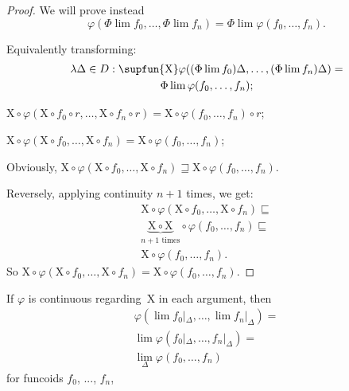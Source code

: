 \begin{proof}
  We will prove instead \[ \varphi (\Phi \lim f_0, \ldots, \Phi \lim f_n) = \Phi
  \lim \varphi (f_0, \ldots, f_n). \]
  
  Equivalently transforming:
\begin{multline*}
  \lambda \Delta \in D : \supfun{\mathrm{X}} \varphi ((\Phi \lim f_0) \Delta,
  \ldots, (\Phi \lim f_n) \Delta) =\\ \Phi \lim \varphi (f_0, \ldots, f_n);
\end{multline*}  

  $\mathrm{X} \circ \varphi (\mathrm{X} \circ f_0 \circ r, \ldots, \mathrm{X} \circ f_n \circ r) =
  \mathrm{X} \circ \varphi (f_0, \ldots, f_n) \circ r$;
  
  $\mathrm{X} \circ \varphi (\mathrm{X} \circ f_0, \ldots, \mathrm{X} \circ f_n) = \mathrm{X} \circ
  \varphi (f_0, \ldots, f_n)$;
  
  Obviously, $\mathrm{X} \circ \varphi (\mathrm{X} \circ f_0, \ldots, \mathrm{X} \circ f_n)
  \sqsupseteq \mathrm{X} \circ \varphi (f_0, \ldots, f_n)$.
  
  Reversely, applying continuity $n + 1$ times, we get:
\begin{multline*}
  \mathrm{X} \circ \varphi (\mathrm{X} \circ f_0, \ldots, \mathrm{X} \circ f_n) \sqsubseteq\\
     \underset{n + 1 \text{ times}}{\underbrace{\mathrm{X} \circ \mathrm{X}}} \circ \varphi
     (f_0, \ldots, f_n) \sqsubseteq\\ \mathrm{X} \circ \varphi (f_0, \ldots, f_n) .
\end{multline*}
  So $\mathrm{X} \circ \varphi (\mathrm{X} \circ f_0, \ldots, \mathrm{X} \circ f_n) = \mathrm{X} \circ
  \varphi (f_0, \ldots, f_n)$.
\end{proof}

\begin{prop}
If $\varphi$ is continuous regarding~$\mathrm{X}$ in each argument, then
\begin{multline*}
  \varphi (\lim f_0 |_{\Delta}, \ldots, \lim f_n |_{\Delta}) =\\ \lim \varphi
  (f_0 |_{\Delta}, \ldots, f_n |_{\Delta}) =\\ \lim_{\Delta} \varphi (f_0,
  \ldots, f_n)
\end{multline*}
for funcoids $f_0$, ..., $f_n$,

\end{prop}

